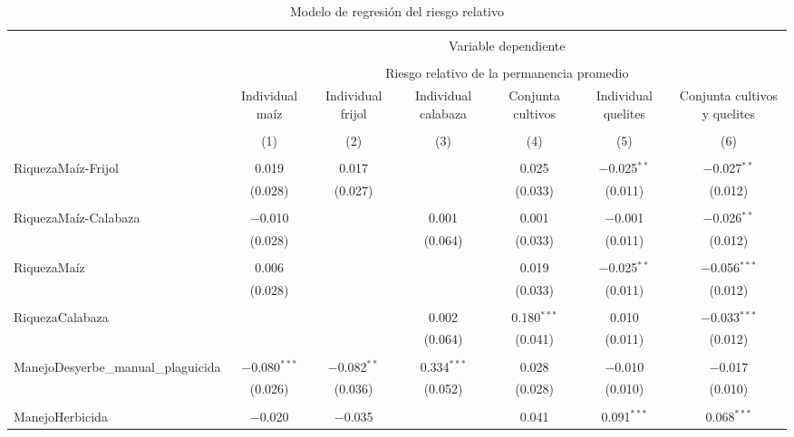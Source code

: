 \documentclass[spanish,11pt]{article}
\begin{document}
\begin{table}[!htbp] \centering 
  \caption{Modelo de regresión del riesgo relativo} 
  \label{} 
\begin{tabular}{@{\extracolsep{5pt}}lcccccc} 
\\[-1.8ex]\hline 
\hline \\[-1.8ex] 
 & \multicolumn{6}{c}{Variable dependiente} \\ 
\cline{2-7} 
\\[-1.8ex] & \multicolumn{6}{c}{Riesgo relativo de la permanencia promedio} \\ 
 & Individual maíz & Individual frijol & Individual calabaza & Conjunta cultivos & Individual quelites & Conjunta cultivos y quelites \\ 
\\[-1.8ex] & (1) & (2) & (3) & (4) & (5) & (6)\\ 
\hline \\[-1.8ex] 
 RiquezaMaíz-Frijol & 0.019 & 0.017 &  & 0.025 & $-$0.025$^{**}$ & $-$0.027$^{**}$ \\ 
  & (0.028) & (0.027) &  & (0.033) & (0.011) & (0.012) \\ 
  & & & & & & \\ 
 RiquezaMaíz-Calabaza & $-$0.010 &  & 0.001 & 0.001 & $-$0.001 & $-$0.026$^{**}$ \\ 
  & (0.028) &  & (0.064) & (0.033) & (0.011) & (0.012) \\ 
  & & & & & & \\ 
 RiquezaMaíz & 0.006 &  &  & 0.019 & $-$0.025$^{**}$ & $-$0.056$^{***}$ \\ 
  & (0.028) &  &  & (0.033) & (0.011) & (0.012) \\ 
  & & & & & & \\ 
 RiquezaCalabaza &  &  & 0.002 & 0.180$^{***}$ & 0.010 & $-$0.033$^{***}$ \\ 
  &  &  & (0.064) & (0.041) & (0.011) & (0.012) \\ 
  & & & & & & \\ 
 ManejoDesyerbe\_manual\_plaguicida & $-$0.080$^{***}$ & $-$0.082$^{**}$ & 0.334$^{***}$ & 0.028 & $-$0.010 & $-$0.017 \\ 
  & (0.026) & (0.036) & (0.052) & (0.028) & (0.010) & (0.010) \\ 
  & & & & & & \\ 
 ManejoHerbicida & $-$0.020 & $-$0.035 &  & 0.041 & 0.091$^{***}$ & 0.068$^{***}$ \\ 

\end{tabular}
\end{table}
\end{document}
